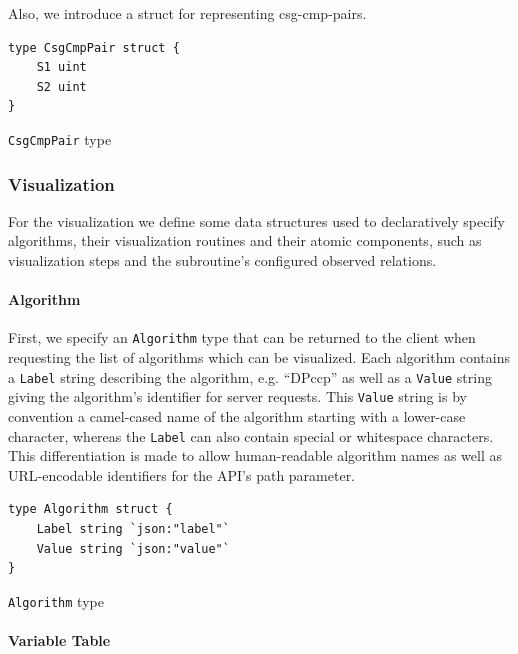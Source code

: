 Also, we introduce a struct for representing csg-cmp-pairs.
\begin{code}
\begin{verbatim}
type CsgCmpPair struct {
    S1 uint
    S2 uint
}
\end{verbatim}
\caption{\texttt{CsgCmpPair} type}
\label{datastructure:csg-cmp-pair}
\end{code}

\vspace{0.8cm}

\subsubsection{Visualization}

For the visualization we define some data structures used to declaratively specify algorithms, their visualization routines and their atomic components, such as visualization steps and the subroutine's configured observed relations. 

\paragraph{Algorithm}

First, we specify an \texttt{Algorithm} type that can be returned to the client when requesting the list of algorithms which can be visualized. Each algorithm contains a \texttt{Label} string describing the algorithm, e.g. ``DPccp'' as well as a \texttt{Value} string giving the algorithm's identifier for server requests. This \texttt{Value} string is by convention a camel-cased name of the algorithm starting with a lower-case character, whereas the \texttt{Label} can also contain special or whitespace characters. This differentiation is made to allow human-readable algorithm names as well as URL-encodable identifiers for the API's path parameter.

\begin{code}
\begin{verbatim}   
type Algorithm struct {
    Label string `json:"label"`
    Value string `json:"value"`
}
\end{verbatim}
\caption{\texttt{Algorithm} type}
\end{code}
\vspace{0.8cm}

\paragraph{Variable Table}


